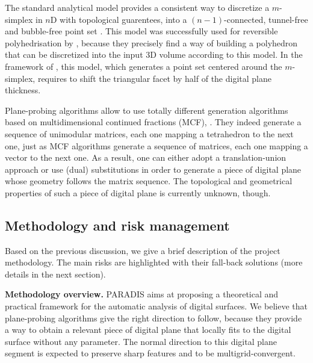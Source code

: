 The standard analytical model provides a consistent way to discretize a $m$-simplex
in $n$D with topological guarentees, \ie into a $(n-1)$-connected, tunnel-free
and bubble-free point set \cite{Andres2003}. This model was successfully
used for reversible polyhedrisation by \citeauthor*{Sivignon2004} \cite{Sivignon2004},
because they precisely find a way of building a polyhedron that can be
discretized into the input 3D volume according to this model.
In the framework of \cite{LPRJMIV2017}, this model, which generates a point set
centered around the $m$-simplex, requires to shift the triangular facet by half of the
digital plane thickness.

Plane-probing algorithms allow to use totally different generation algorithms
based on multidimensional continued fractions (MCF), \eg \cite{Fernique2009,Jamet2016}. 
They indeed generate a sequence of unimodular matrices, each one mapping a tetrahedron to
the next one, just as MCF algorithms generate a sequence of matrices, each one mapping
a vector to the next one. As a result, one can either adopt a translation-union approach \cite{Jamet2016}
or use (dual) substitutions \cite{Fernique2009} in order to generate a piece
of digital plane whose geometry follows the matrix sequence. The topological and geometrical
properties of such a piece of digital plane is currently unknown, though.  



\subsection{Methodology and risk management}
\label{sec:methodo}


Based on the previous discussion, we give a brief description of the project methodology.
The main risks are highlighted with their fall-back solutions (more details in the next section).  

\noindent\textbf{Methodology overview.}
PARADIS aims at proposing a theoretical and practical framework for the automatic
analysis of digital surfaces. We believe that plane-probing algorithms give the right
direction to follow, because they provide a way to obtain a relevant piece of digital
plane that locally fits to the digital surface without any parameter. The normal direction
to this digital plane segment is expected to preserve sharp features and to be multigrid-convergent.

